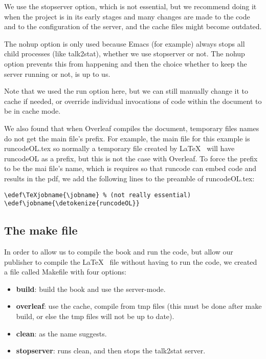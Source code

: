 \documentclass[12pt]{article}
\edef\TeXjobname{\jobname} %
\edef\jobname{\detokenize{runcodeOL}}
\begin{document}
We use the stopserver option, which is not essential, but we recommend doing it when the project is in its early stages and many changes are made to the code and to the configuration of the server, and the cache files might become outdated.

The nohup option is only used because Emacs (for example) always stops all child processes (like talk2stat), whether we use stopserver or not. The nohup option prevents this from happening and then the choice whether to keep the server running or not, is up to us.

Note that we used the run option here, but we can still manually change it to cache if needed, or override individual invocations of code within the document to be in cache mode.

\bigskip
We also  found that when Overleaf compiles the document, temporary files names do not get the main file's prefix. For example, the main file for this example is runcodeOL.tex so normally a temporary file created by \LaTeX~ will have runcodeOL as a prefix, but this is not the case with Overleaf. To force the prefix to be the mai file's name, which is requires so that runcode can embed code and results in the pdf, we add the following lines to the preamble of runcodeOL.tex:
\begin{tcolorbox}
\begin{Verbatim}
\edef\TeXjobname{\jobname} % (not really essential)
\edef\jobname{\detokenize{runcodeOL}}
\end{Verbatim}
\end{tcolorbox}

\subsection*{The make file}

In order to allow us to compile the book and run the code, but allow our publisher to compile the \LaTeX~ file without having to run the code, we created a file called Makefile with four options:
\begin{itemize}
 \item \textbf{build}: build the book and use the server-mode.
 \item \textbf{overleaf}: use the cache, compile from tmp files (this must be done after make build, or else the tmp files will not be up to date).
 \item \textbf{clean}: as the name suggests.
 \item \textbf{stopserver}: runs clean, and then stops the talk2stat server.
\end{itemize}
\end{document}
